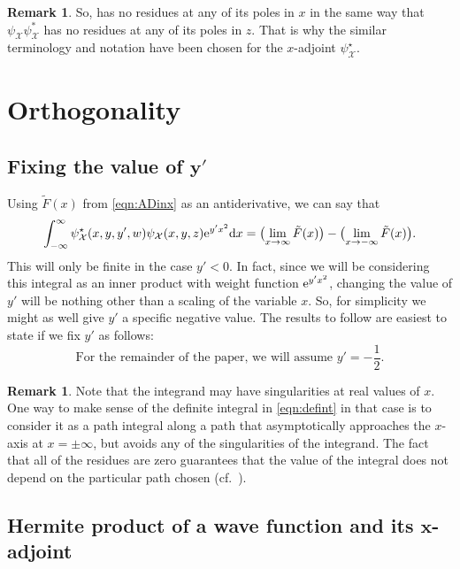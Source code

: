 \documentclass[pdftex]{sigma}
\numberwithin{equation}{section}
\theoremstyle{definition}
\newtheorem{Remark}[Theorem]{Remark}
\def\psistar{\psi^{\star}}
\def\X{\mathcal{X}}
\begin{document}
\begin{Remark}
So, \smash{$\psistar_{\X}\psi_{\X} {\rm e}^{y'x^2}$} has no residues at any of its
poles in $x$ in the same way that $\psi_{\X}\psi^*_{\X}$ has no
residues at any of its poles in $z$.
That is why the similar terminology and notation have been chosen for
the $x$-adjoint $\psistar_{\X}$.
\end{Remark}

\section{Orthogonality}\label{sec:scalarorthog}\label{sec:almostbiorthog}

\subsection[Fixing the value of y']{Fixing the value of $\boldsymbol{y'}$}

Using $\tilde F(x)$ from \eqref{eqn:ADinx} as an antiderivative, we
can say that
\begin{equation}
\int_{-\infty}^{\infty}
\psistar_{\X}(x,y,y',w) \psi_{\X}(x,y,z) {\rm e}^{y'x^2}{\rm d}x=\bigl(\lim_{x\to\infty}
\tilde F(x)\bigr)-\bigl(\lim_{x\to-\infty}\tilde F(x)\bigr).
 \label{eqn:defint}
\end{equation}
This will only be finite in the case $y'<0$. In fact, since we will
be considering this integral as an inner product with weight function
${\rm e}^{y'x^2}$, changing the value of $y'$ will be nothing other than a
scaling of the variable $x$. So, for simplicity we might as well give
$y'$ a specific negative value. The results to follow are
easiest to state if we fix $y'$ as follows:
\[
\text{For the remainder of the paper, we will assume $y'=-\frac{1}{2}$.}
\]
\begin{Remark}
 Note that the integrand may have singularities at real values of
 $x$. One way to make sense of the definite integral in
 \eqref{eqn:defint} in that case is to consider it as a path integral along
 a path that asymptotically approaches the $x$-axis at $x=\pm\infty$,
 but avoids any of the singularities of the integrand. The fact that
 all of the residues are zero guarantees that the value of the
 integral does not depend on the particular path chosen (cf.~\cite{HHV}).
\end{Remark}
\subsection[Hermite product of a wave function
 and its x-adjoint]{Hermite product of a wave function
 and its $\boldsymbol{x}$-adjoint}
\end{document}
